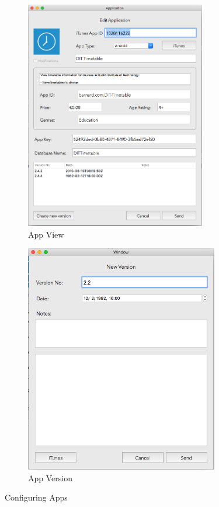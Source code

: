 \begin{figure}[!h]
    \begin{subfigure}{0.5\textwidth}
        \includegraphics[width=0.9\linewidth, height=10cm]{images/dashboard/newapp}
        \caption{App View}
        \label{fig:subim1}
    \end{subfigure}
    \begin{subfigure}{0.5\textwidth}
        \includegraphics[width=0.9\linewidth, height=10cm]{images/dashboard/newversion}
        \caption{App Version}
        \label{fig:subim2}
    \end{subfigure}
\caption{Configuring Apps}
\label{fig:app-version}
\end{figure}

